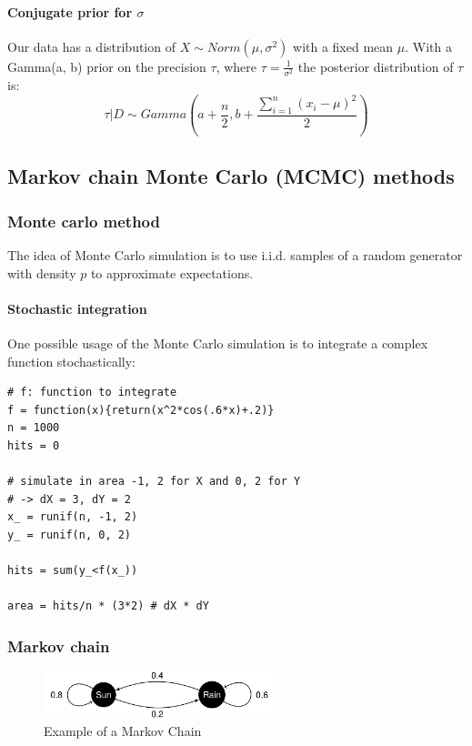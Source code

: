 \paragraph{Conjugate prior for $\sigma$}
Our data has a distribution of $X\sim Norm(\mu, \sigma^2)$ with a fixed mean $\mu$. With a Gamma(a, b) prior on the precision $\tau$, where $\tau = \frac{1}{\sigma^2}$ the posterior distribution of $\tau$ is:
\begin{equation*}
\tau|D\sim Gamma\left(a+\frac{n}{2}, b+\frac{\sum_{i=1}^{n}(x_i-\mu)^2}{2}\right)
\end{equation*}

\subsection{Markov chain Monte Carlo (MCMC) methods}

\subsubsection{Monte carlo method}

The idea of Monte Carlo simulation is to use i.i.d. samples of a random generator with density $p$ to approximate expectations.

\paragraph{Stochastic integration}
One possible usage of the Monte Carlo simulation is to integrate a complex function stochastically:
\begin{lstlisting}
# f: function to integrate
f = function(x){return(x^2*cos(.6*x)+.2)}
n = 1000
hits = 0

# simulate in area -1, 2 for X and 0, 2 for Y
# -> dX = 3, dY = 2
x_ = runif(n, -1, 2)
y_ = runif(n, 0, 2)

hits = sum(y_<f(x_))

area = hits/n * (3*2) # dX * dY
\end{lstlisting}

\subsubsection{Markov chain}
\begin{figure}[H]
	\centering
	\includegraphics[width=0.6\textwidth]{images/markov-chain-example.png}
	\caption{Example of a Markov Chain}
\end{figure}

